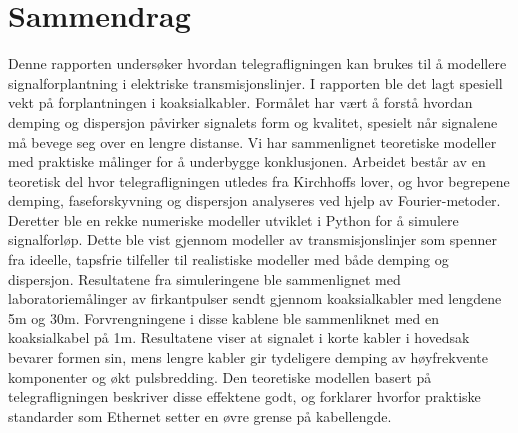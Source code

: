 \section*{Sammendrag}
Denne rapporten undersøker hvordan telegrafligningen kan brukes til å modellere signalforplantning i elektriske transmisjonslinjer. I rapporten ble det lagt spesiell vekt på forplantningen i koaksialkabler. Formålet har vært å forstå hvordan demping og dispersjon påvirker signalets form og kvalitet, spesielt når signalene må bevege seg over en lengre distanse. Vi har sammenlignet teoretiske modeller med praktiske målinger for å underbygge konklusjonen. 
Arbeidet består av en teoretisk del hvor telegrafligningen utledes fra Kirchhoffs lover, og hvor begrepene demping, faseforskyvning og dispersjon analyseres ved hjelp av Fourier-metoder. Deretter ble en rekke numeriske modeller utviklet i Python for å simulere signalforløp. Dette ble vist gjennom modeller av transmisjonslinjer som spenner fra ideelle, tapsfrie tilfeller til realistiske modeller med både demping og dispersjon. Resultatene fra simuleringene ble sammenlignet med laboratoriemålinger av firkantpulser sendt gjennom koaksialkabler med lengdene 5m og 30m. Forvrengningene i disse kablene ble sammenliknet med en koaksialkabel på 1m.
Resultatene viser at signalet i korte kabler i hovedsak bevarer formen sin, mens lengre kabler gir tydeligere demping av høyfrekvente komponenter og økt pulsbredding. Den teoretiske modellen basert på telegrafligningen beskriver disse effektene godt, og forklarer hvorfor praktiske standarder som Ethernet setter en øvre grense på kabellengde.

